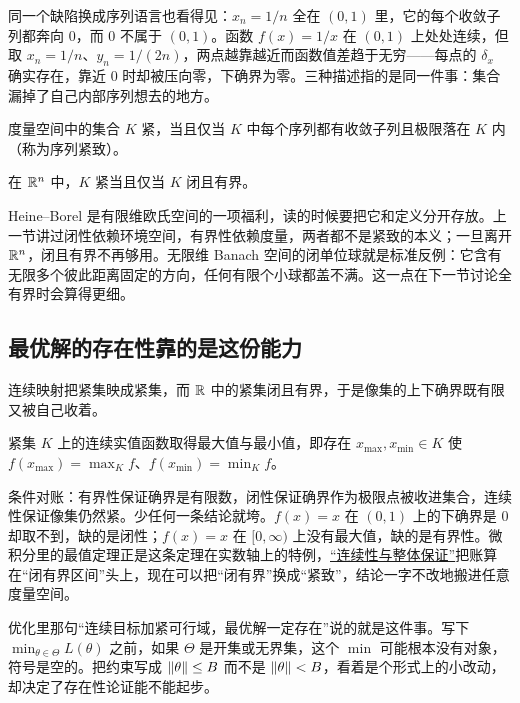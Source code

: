 同一个缺陷换成序列语言也看得见：\(x_n=1/n\) 全在 \((0,1)\) 里，它的每个收敛子列都奔向 0，而 0 不属于 \((0,1)\)。函数 \(f(x)=1/x\) 在 \((0,1)\) 上处处连续，但取 \(x_n=1/n\)、\(y_n=1/(2n)\)，两点越靠越近而函数值差趋于无穷——每点的 \(\delta_x\) 确实存在，靠近 0 时却被压向零，下确界为零。三种描述指的是同一件事：集合漏掉了自己内部序列想去的地方。

\begin{proposition}
度量空间中的集合 \(K\) 紧，当且仅当 \(K\) 中每个序列都有收敛子列且极限落在 \(K\) 内（称为序列紧致）。
\end{proposition}

\begin{theorem}
在 \(\mathbb{R}^n\) 中，\(K\) 紧当且仅当 \(K\) 闭且有界。
\end{theorem}

Heine--Borel 是有限维欧氏空间的一项福利，读的时候要把它和定义分开存放。上一节讲过闭性依赖环境空间，有界性依赖度量，两者都不是紧致的本义；一旦离开 \(\mathbb{R}^n\)，闭且有界不再够用。无限维 Banach 空间的闭单位球就是标准反例：它含有无限多个彼此距离固定的方向，任何有限个小球都盖不满。这一点在下一节讨论全有界时会算得更细。

\subsection{最优解的存在性靠的是这份能力}

连续映射把紧集映成紧集，而 \(\mathbb{R}\) 中的紧集闭且有界，于是像集的上下确界既有限又被自己收着。

\begin{theorem}[极值定理]
紧集 \(K\) 上的连续实值函数取得最大值与最小值，即存在 \(x_{\max},x_{\min}\in K\) 使 \(f(x_{\max})=\max_K f\)、\(f(x_{\min})=\min_K f\)。
\end{theorem}

条件对账：有界性保证确界是有限数，闭性保证确界作为极限点被收进集合，连续性保证像集仍然紧。少任何一条结论就垮。\(f(x)=x\) 在 \((0,1)\) 上的下确界是 0 却取不到，缺的是闭性；\(f(x)=x\) 在 \([0,\infty)\) 上没有最大值，缺的是有界性。微积分里的最值定理正是这条定理在实数轴上的特例，\hyperref[sec:02-Calculus/02-Limits-and-Continuity/04]{``连续性与整体保证''}把账算在``闭有界区间''头上，现在可以把``闭有界''换成``紧致''，结论一字不改地搬进任意度量空间。

优化里那句``连续目标加紧可行域，最优解一定存在''说的就是这件事。写下 \(\min_{\theta\in\Theta}L(\theta)\) 之前，如果 \(\Theta\) 是开集或无界集，这个 \(\min\) 可能根本没有对象，符号是空的。把约束写成 \(\left\lVert\theta\right\rVert\le B\) 而不是 \(\left\lVert\theta\right\rVert<B\)，看着是个形式上的小改动，却决定了存在性论证能不能起步。

